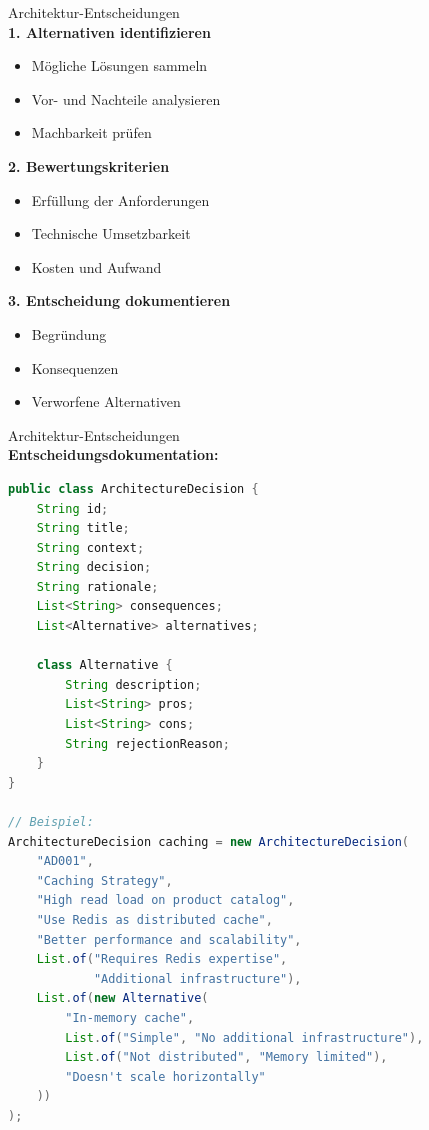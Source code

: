 \begin{KR}{Architektur-Entscheidungen}\\
\textbf{1. Alternativen identifizieren}
\begin{itemize}
    \item Mögliche Lösungen sammeln
    \item Vor- und Nachteile analysieren
    \item Machbarkeit prüfen
\end{itemize}

\textbf{2. Bewertungskriterien}
\begin{itemize}
    \item Erfüllung der Anforderungen
    \item Technische Umsetzbarkeit
    \item Kosten und Aufwand
\end{itemize}

\textbf{3. Entscheidung dokumentieren}
\begin{itemize}
    \item Begründung
    \item Konsequenzen
    \item Verworfene Alternativen
\end{itemize}
\end{KR}

\begin{example2}{Architektur-Entscheidungen}\\
\textbf{Entscheidungsdokumentation:}

\begin{lstlisting}[language=Java, style=basesmol]
public class ArchitectureDecision {
    String id;
    String title;
    String context;
    String decision;
    String rationale;
    List<String> consequences;
    List<Alternative> alternatives;
    
    class Alternative {
        String description;
        List<String> pros;
        List<String> cons;
        String rejectionReason;
    }
}

// Beispiel:
ArchitectureDecision caching = new ArchitectureDecision(
    "AD001",
    "Caching Strategy",
    "High read load on product catalog",
    "Use Redis as distributed cache",
    "Better performance and scalability",
    List.of("Requires Redis expertise", 
            "Additional infrastructure"),
    List.of(new Alternative(
        "In-memory cache",
        List.of("Simple", "No additional infrastructure"),
        List.of("Not distributed", "Memory limited"),
        "Doesn't scale horizontally"
    ))
);
\end{lstlisting}
\end{example2}

